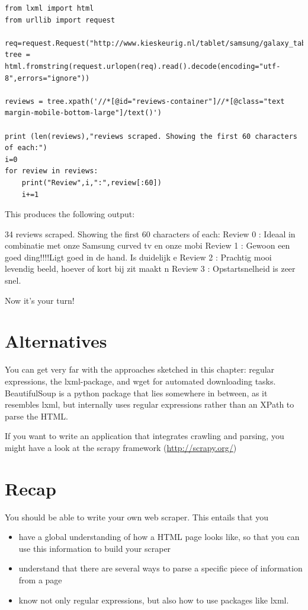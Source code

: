 \documentclass[a4paper,12pt]{book}
\begin{document}
\begin{lstlisting}
from lxml import html
from urllib import request

req=request.Request("http://www.kieskeurig.nl/tablet/samsung/galaxy_tab_3_101_wifi_16gb/reviews/1344691")
tree = html.fromstring(request.urlopen(req).read().decode(encoding="utf-8",errors="ignore"))        

reviews = tree.xpath('//*[@id="reviews-container"]//*[@class="text margin-mobile-bottom-large"]/text()')

print (len(reviews),"reviews scraped. Showing the first 60 characters of each:")
i=0
for review in reviews:
    print("Review",i,":",review[:60])
    i+=1
\end{lstlisting}


This produces the following output:

\begin{lstlistingoutput}
34 reviews scraped. Showing the first 60 characters of each:
Review 0 : Ideaal in combinatie met onze Samsung curved tv en onze mobi
Review 1 : Gewoon een goed ding!!!!Ligt goed in de hand. Is duidelijk e
Review 2 : Prachtig mooi levendig beeld, hoever of kort bij zit maakt n
Review 3 :  Opstartsnelheid is zeer snel.
\end{lstlistingoutput}

Now it's your turn!


\section{Alternatives}
You can get very far with the approaches sketched in this chapter: regular expressions, the lxml-package, and wget for automated downloading tasks. BeautifulSoup is a python package that lies somewhere in between, as it resembles lxml, but internally uses regular expressions rather than an XPath to parse the HTML. 

If you want to write an application that integrates crawling and parsing, you might have a look at the scrapy framework (\url{http://scrapy.org/})

\section{Recap}
You should be able to write your own web scraper. This entails that you
\begin{itemize}
	\item have a global understanding of how a HTML page looks like, so that you can use this information to build your scraper
	\item understand that there are several ways to parse a specific piece of information from a page
	\item know not only regular expressions, but also how to use packages like lxml.
\end{itemize}
\end{document}
